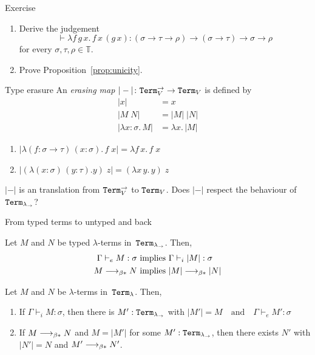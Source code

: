 \begin{frame}{Exercise}
  \begin{enumerate}
    \item Derive the judgement
      \[
        \vdash \lambda f\,g\,x.\, f\,x\, (g\,x) : (\sigma \to \tau \to \rho) \to
        (\sigma\to\tau) \to \sigma\to\rho 
      \]
      for every $\sigma, \tau, \rho \in \mathbb{T}$.

    \item Prove Proposition~\ref{prop:unicity}.

    
  \end{enumerate}

\end{frame}


\begin{frame}{Type erasure}
An \emph{erasing map} $|-|\colon \mathtt{Term}_{V}^{\to} \to \mathtt{Term}_{V}$ is defined by
  \begin{align*}
    |x| & = x \\
    |M\; N| & = |M|\;|N| \\
    |\lambda x:\sigma.\, M| & = \lambda x.\, |M|
  \end{align*}
  \begin{example}
    \begin{enumerate}
      \item $|\lambda (f: \sigma \to \tau)\,(x: \sigma).\, f\;x| = \lambda f\, x.\, f\;x$
      \item $|(\lambda (x: \sigma)\,(y: \tau). y)\;z| = (\lambda x\,y.\, y)\; z$
    \end{enumerate}
  \end{example}

$|-|$ is an translation from $\mathtt{Term}_{V}^{\to}$ to $\mathtt{Term}_{V}$.
  Does $|-|$ respect the behaviour of $\mathtt{Term}_{\lambda_\to}$?
\end{frame}
\begin{frame}{From typed terms to untyped and back}
\begin{proposition}
  Let $M$ and $N$ be typed $\lambda$-terms in~$\mathtt{Term}_{\lambda_\to}$. Then, 
  \begin{align*}
    \Gamma  \vdash_e M : \sigma & \text{ implies } \Gamma \vdash_i |M| :
    \sigma \\ 
    M \longrightarrow_{\beta*} N & \text{ implies } |M| \longrightarrow_{\beta*} |N|
  \end{align*}
\end{proposition}

\begin{proposition}
  Let $M$ and $N$ be $\lambda$-terms in~$\mathtt{Term}_{\lambda}$. Then, 
  \begin{enumerate}
  \item If $\Gamma \vdash_i M : \sigma$, then there is $M' : \mathtt{Term}_{\lambda_\to}$ with 
        $|M'| = M
        \quad\text{and}\quad
        \Gamma \vdash_e M' : \sigma$
      \item If $M \longrightarrow_{\beta*} N$ and $M = |M'|$ for some $M' : \mathtt{Term}_{\lambda_\to}$,
      then there exists $N'$ with $|N'| = N$ and $M' \longrightarrow_{\beta*} N'$.
    \end{enumerate}
\end{proposition}
\end{frame}

